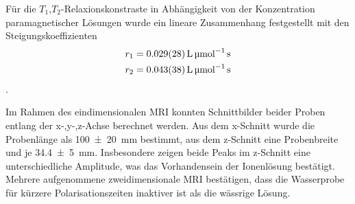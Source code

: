 \documentclass[../main.tex]{subfiles}
\begin{document}
    Für die $T_1$,$T_2$-Relaxionskonstraste in Abhängigkeit von der Konzentration paramagnetischer Lösungen wurde ein lineare Zusammenhang festgestellt mit den Steigungskoeffizienten 
    \begin{align*}
        r_{1} = \SI{0,029 +- 0,028}{\litre \per \micro \mol \second} \\
        r_{2} = \SI{0,043 +- 0,038}{\litre \per \micro \mol \second}
    \end{align*}.
    
    Im Rahmen des eindimensionalen MRI konnten Schnittbilder beider Proben entlang der x-,y-,z-Achse berechnet werden. Aus dem x-Schnitt wurde die Probenlänge als \SI{100(20)}{\milli\metre} bestimmt, aus dem z-Schnitt eine Probenbreite und je \SI{34.4(50)}{\milli\metre}. Insbesondere zeigen beide Peaks im z-Schnitt eine unterschiedliche Amplitude, was das Vorhandensein der Ionenlösung bestätigt. Mehrere aufgenommene zweidimensionale MRI bestätigen, dass die Wasserprobe für kürzere Polarisationszeiten inaktiver ist als die wässrige Lösung. 
\end{document}
